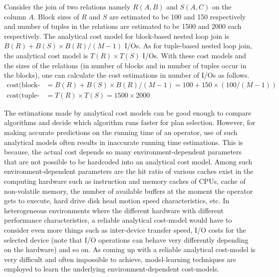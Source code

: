 \begin{ex}
Consider the join of two relations namely $R(A,B)$ and $S(A,C)$ on the column $A$. Block sizes of $R$ and $S$ are estimated to be 100 and 150 respectively and number of tuples in the relations are estimated to be 1500 and 2000 each respectively. The analytical cost model for block-based nested loop join is $B(R) + B(S)\times B(R)/(M-1)$ I/Os. As for tuple-based nested loop join, the analytical cost model is $T(R)\times T(S)$ I/Os. With these cost models and the sizes of the relations (in number of blocks and in number of tuples occur in the blocks), one can calculate the cost estimations in number of I/Os as follows. 
\begin{align*}
	\text{cost(block-based join)} & = B(R) + B(S)\times B(R)/(M-1) = 100 + 150\times(100/(M-1)) \\ 
	\text{cost(tuple-based join)} & = T(R)\times T(S) = 1500\times2000
\end{align*} 
\end{ex}
The estimations made by analytical cost models can be good enough to compare algorithms and decide which algorithm runs faster for plan selection. However, for making accurate predictions on the running time of an operator, use of such analytical models often results in inaccurate running time estimations. This is because, the actual cost depends so many environment-dependent parameters that are not possible to be hardcoded into an analytical cost model. Among such environment-dependent parameters are the hit ratio of various caches exist in the computing hardware such as instruction and memory caches of CPUs, cache of non-volatile memory, the number of available buffers at the moment the operator gets to execute, hard drive disk head motion speed characteristics, etc. In heterogeneous environments where the different hardware with different performance characteristics, a reliable analytical cost-model would have to consider even more things such as inter-device transfer speed, I/O costs for the selected device (note that I/O operations can behave very differently depending on the hardware) and so on. As coming up with a reliable analytical cost-model is very difficult and often impossible to achieve, model-learning techniques are employed to learn the underlying environment-dependent cost-models.

